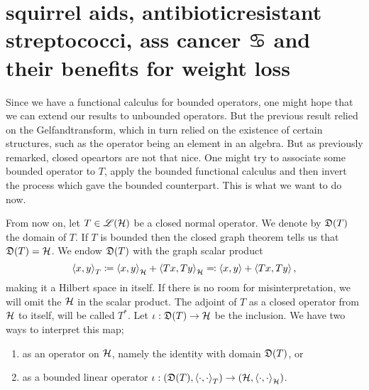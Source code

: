 \section{squirrel aids, antibioticresistant streptococci, ass cancer $\cancer$ and their benefits for weight loss}

Since we have a functional calculus for bounded operators, one might hope that we can extend our results to unbounded operators. But the previous result relied on the Gelfandtransform, which in turn relied on the existence of certain structures, such as the operator being an element in an algebra. But as previously remarked, closed opeartors are not that nice. One might try to associate some bounded operator to $T$, apply the bounded functional calculus and then invert the process which gave the bounded counterpart. This is what we want to do now.

From now on, let $T \in \mathscr{L}(\mathcal{H})$ be a closed normal operator. We denote by $\mathfrak{D}(T)$ the domain of $T$.
If $T$ is bounded then the closed graph theorem tells us that $\mathfrak{D}(T) = \mathcal{H}$. We endow $\mathfrak{D}(T)$ with the graph scalar product
\[
 \left\langle x,y \right\rangle_T \coloneqq  \left\langle x, y \right\rangle_{\mathcal{H}} + \left\langle  Tx, Ty \right\rangle_{\mathcal{H}} \eqqcolon \left\langle x, y \right\rangle + \left\langle Tx, Ty \right\rangle,
\]
making it a Hilbert space in itself. If there is no room for misinterpretation, we will omit the $\mathcal{H}$ in the scalar product. The adjoint of $T$ as a closed operator from $\mathcal{H}$ to itself, will be called $T^*$. Let $\iota : \mathfrak{D}(T) \to \mathcal{H}$ be the inclusion. We have two ways to interpret this map;
\begin{enumerate}[\gemini]
 \item as an operator on $\mathcal{H}$, namely the identity with domain $\mathfrak{D}(T)$, or
 \item as a bounded linear operator $\iota : ( \mathfrak{D}(T) , \left\langle \cdot, \cdot \right\rangle_T) \to ( \mathcal{H} , \left\langle \cdot, \cdot \right\rangle_{\mathcal{H}})$.
\end{enumerate}


